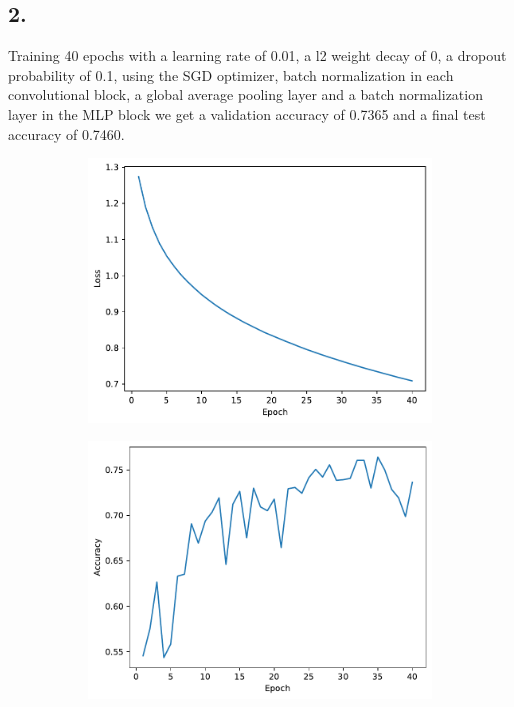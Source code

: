 \documentclass[a4paper, 12pt]{article}
\begin{document}
\subsection*{2.}
Training 40 epochs with a learning rate of 0.01, a l2 weight decay of 0, a dropout probability of 0.1, using the SGD optimizer, batch normalization in each convolutional block, a global average pooling layer and a batch normalization layer in the MLP block we get a validation accuracy of 0.7365 and a final test accuracy of 0.7460. 
\begin{figure}[H]
    \centering
    \begin{subfigure}{0.45\linewidth}
        \centering
        \includegraphics[width=\linewidth]{plot/q2/CNN-3-train-loss-40-8-0.01-0-0.1-sgd-False-False-74.60.pdf}
        \label{fig:batch_loss_0.01}
    \end{subfigure}
    \hspace{0.05\linewidth}
    \begin{subfigure}{0.45\linewidth}
        \centering
        \includegraphics[width=\linewidth]{plot/q2/CNN-3-valid-accuracy-40-8-0.01-0-0.1-sgd-False-False-74.60.pdf}

\end{subfigure}
\end{figure}
\end{document}
